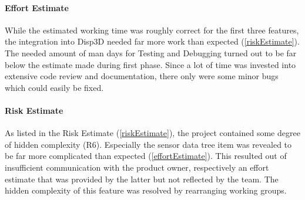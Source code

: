 \paragraph{Effort Estimate}

While the estimated working time was roughly correct for the first three features, the integration into Disp3D needed far more work than expected (\ref{riskEstimate}).\\
The needed amount of man days for Testing and Debugging turned out to be far below the estimate made during first phase. Since a lot of time was invested into extensive code review and documentation, there only were some minor bugs which could easily be fixed.


\paragraph{Risk Estimate}

As listed in the Risk Estimate (\ref{riskEstimate}), the project contained some degree of hidden complexity (R6). Especially the sensor data tree item was revealed to be far more complicated than expected (\ref{effortEstimate}). This resulted out of insufficient communication with the product owner, respectively an effort estimate that was provided by the latter but not reflected by the team. The hidden complexity of this feature was resolved by rearranging working groups.
